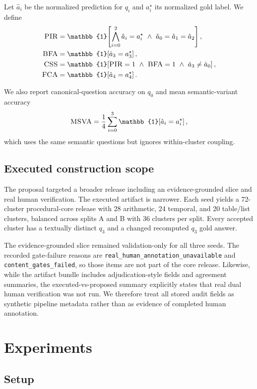 \documentclass{article}
\newcommand{\pir}{\textsc{PIR}}
\newcommand{\bfa}{\textsc{BFA}}
\newcommand{\css}{\textsc{CSS}}
\newcommand{\fca}{\textsc{FCA}}
\newcommand{\msva}{\textsc{MSVA}}
\begin{document}
Let $\hat{a}_i$ be the normalized prediction for $q_i$ and $a_i^\star$ its normalized gold label. We define
\begin{align}
\pir &= \mathbb{1}\!\left[\bigwedge_{i=0}^{2} \hat{a}_i = a_i^\star \ \land\ \hat{a}_0 = \hat{a}_1 = \hat{a}_2 \right], \\
\bfa &= \mathbb{1}\!\left[\hat{a}_3 = a_3^\star \right], \\
\css &= \mathbb{1}\!\left[\pir = 1 \ \land\ \bfa = 1 \ \land\ \hat{a}_3 \neq \hat{a}_0 \right], \\
\fca &= \mathbb{1}\!\left[\hat{a}_4 = a_4^\star \right].
\end{align}

We also report canonical-question accuracy on $q_0$ and mean semantic-variant accuracy
\[
\msva = \frac{1}{4}\sum_{i=0}^{3} \mathbb{1}\!\left[\hat{a}_i = a_i^\star \right],
\]
which uses the same semantic questions but ignores within-cluster coupling.

\subsection{Executed construction scope}

The proposal targeted a broader release including an evidence-grounded slice and real human verification. The executed artifact is narrower. Each seed yields a 72-cluster procedural-core release with 28 arithmetic, 24 temporal, and 20 table/list clusters, balanced across splits A and B with 36 clusters per split. Every accepted cluster has a textually distinct $q_3$ and a changed recomputed $q_3$ gold answer.

The evidence-grounded slice remained validation-only for all three seeds. The recorded gate-failure reasons are \texttt{real\_human\_annotation\_unavailable} and \texttt{content\_gates\_failed}, so those items are not part of the core release. Likewise, while the artifact bundle includes adjudication-style fields and agreement summaries, the executed-vs-proposed summary explicitly states that real dual human verification was not run. We therefore treat all stored audit fields as synthetic pipeline metadata rather than as evidence of completed human annotation.

\section{Experiments}
\label{sec:experiments}

\subsection{Setup}
\end{document}
